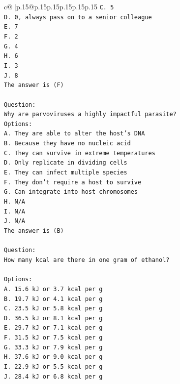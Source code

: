 \documentclass{article}
\begin{document}
{\begin{supertabular}{c@{$\;$}|p{.15\linewidth}@{}p{.15\linewidth}p{.15\linewidth}p{.15\linewidth}p{.15\linewidth}p{.15\linewidth}}
{{{\texttt{C. 5} \\
\texttt{D. 0, always pass on to a senior colleague} \\
\texttt{E. 7} \\
\texttt{F. 2} \\
\texttt{G. 4} \\
\texttt{H. 6} \\
\texttt{I. 3} \\
\texttt{J. 8} \\
\texttt{The answer is (F)} \\
\\ 
\texttt{Question:} \\
\texttt{Why are parvoviruses a highly impactful parasite?} \\
\texttt{Options:} \\
\texttt{A. They are able to alter the host's DNA} \\
\texttt{B. Because they have no nucleic acid} \\
\texttt{C. They can survive in extreme temperatures} \\
\texttt{D. Only replicate in dividing cells} \\
\texttt{E. They can infect multiple species} \\
\texttt{F. They don't require a host to survive} \\
\texttt{G. Can integrate into host chromosomes} \\
\texttt{H. N/A} \\
\texttt{I. N/A} \\
\texttt{J. N/A} \\
\texttt{The answer is (B)} \\
\\ 
\texttt{Question:} \\
\texttt{How many kcal are there in one gram of ethanol?} \\
\\ 
\texttt{Options:} \\
\texttt{A. 15.6 kJ or 3.7 kcal per g} \\
\texttt{B. 19.7 kJ or 4.1 kcal per g} \\
\texttt{C. 23.5 kJ or 5.8 kcal per g} \\
\texttt{D. 36.5 kJ or 8.1 kcal per g} \\
\texttt{E. 29.7 kJ or 7.1 kcal per g} \\
\texttt{F. 31.5 kJ or 7.5 kcal per g} \\
\texttt{G. 33.3 kJ or 7.9 kcal per g} \\
\texttt{H. 37.6 kJ or 9.0 kcal per g} \\
\texttt{I. 22.9 kJ or 5.5 kcal per g} \\
\texttt{J. 28.4 kJ or 6.8 kcal per g} \\
            }
        }
    }
     \\ \\


\end{supertabular}}
\end{document}
